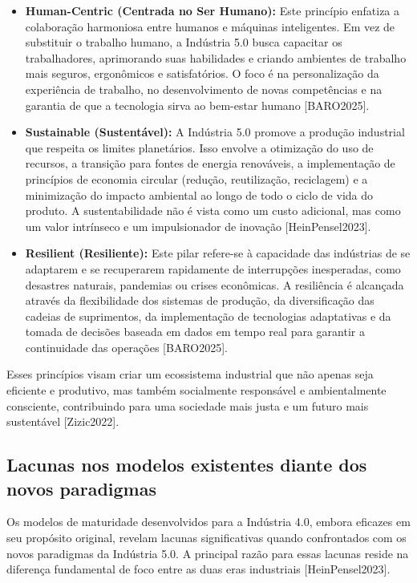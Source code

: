 \begin{itemize}
    \item \textbf{Human-Centric (Centrada no Ser Humano):} Este princípio enfatiza a colaboração harmoniosa entre humanos e máquinas inteligentes. Em vez de substituir o trabalho humano, a Indústria 5.0 busca capacitar os trabalhadores, aprimorando suas habilidades e criando ambientes de trabalho mais seguros, ergonômicos e satisfatórios. O foco é na personalização da experiência de trabalho, no desenvolvimento de novas competências e na garantia de que a tecnologia sirva ao bem-estar humano [BARO2025].
    \item \textbf{Sustainable (Sustentável):} A Indústria 5.0 promove a produção industrial que respeita os limites planetários. Isso envolve a otimização do uso de recursos, a transição para fontes de energia renováveis, a implementação de princípios de economia circular (redução, reutilização, reciclagem) e a minimização do impacto ambiental ao longo de todo o ciclo de vida do produto. A sustentabilidade não é vista como um custo adicional, mas como um valor intrínseco e um impulsionador de inovação [HeinPensel2023].
    \item \textbf{Resilient (Resiliente):} Este pilar refere-se à capacidade das indústrias de se adaptarem e se recuperarem rapidamente de interrupções inesperadas, como desastres naturais, pandemias ou crises econômicas. A resiliência é alcançada através da flexibilidade dos sistemas de produção, da diversificação das cadeias de suprimentos, da implementação de tecnologias adaptativas e da tomada de decisões baseada em dados em tempo real para garantir a continuidade das operações [BARO2025].
\end{itemize}

Esses princípios visam criar um ecossistema industrial que não apenas seja eficiente e produtivo, mas também socialmente responsável e ambientalmente consciente, contribuindo para uma sociedade mais justa e um futuro mais sustentável [Zizic2022].

\subsection{Lacunas nos modelos existentes diante dos novos paradigmas}

Os modelos de maturidade desenvolvidos para a Indústria 4.0, embora eficazes em seu propósito original, revelam lacunas significativas quando confrontados com os novos paradigmas da Indústria 5.0. A principal razão para essas lacunas reside na diferença fundamental de foco entre as duas eras industriais [HeinPensel2023].

